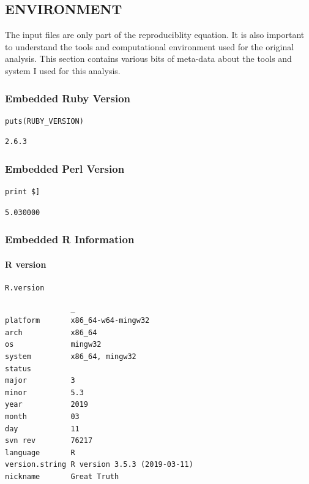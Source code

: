 \documentclass[11pt]{article}
\begin{document}
\subsection{ENVIRONMENT}
\label{sec:org0dd90a2}

The input files are only part of the reproduciblity equation.  It is also important to understand the tools and computational environment used for the
original analysis.  This section contains various bits of meta-data about the tools and system I used for this analysis.

\subsubsection{Embedded Ruby Version}
\label{sec:org47f9761}

\begin{verbatim}
puts(RUBY_VERSION)
\end{verbatim}

\begin{verbatim}
2.6.3
\end{verbatim}

\subsubsection{Embedded Perl Version}
\label{sec:org5f8e6fe}

\begin{verbatim}
print $]
\end{verbatim}

\begin{verbatim}
5.030000
\end{verbatim}

\subsubsection{Embedded R Information}
\label{sec:org60a83f1}

\paragraph{R version}
\label{sec:orgdedce00}

\begin{verbatim}
R.version
\end{verbatim}

\begin{verbatim}
               _                           
platform       x86_64-w64-mingw32          
arch           x86_64                      
os             mingw32                     
system         x86_64, mingw32             
status                                     
major          3                           
minor          5.3                         
year           2019                        
month          03                          
day            11                          
svn rev        76217                       
language       R                           
version.string R version 3.5.3 (2019-03-11)
nickname       Great Truth                 
\end{verbatim}
\end{document}
